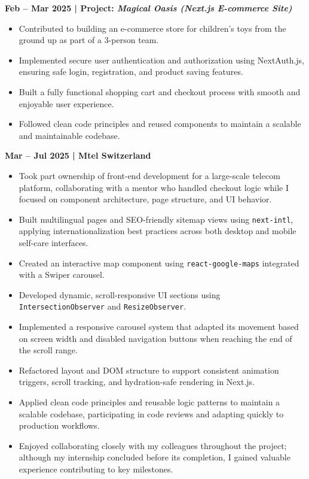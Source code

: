 \documentclass[11pt]{article}
\begin{document}
\textbf{Feb – Mar 2025 | Project: \textit{Magical Oasis (Next.js E-commerce Site)}}
\begin{itemize}[leftmargin=*]
  \item Contributed to building an e-commerce store for children’s toys from the ground up as part of a 3-person team.
  \item Implemented secure user authentication and authorization using NextAuth.js, ensuring safe login, registration, and product saving features.
  \item Built a fully functional shopping cart and checkout process with smooth and enjoyable user experience.
  \item Followed clean code principles and reused components to maintain a scalable and maintainable codebase.
\end{itemize}

\textbf{Mar – Jul 2025 | Mtel Switzerland}
\begin{itemize}[leftmargin=*]
  \item Took part ownership of front-end development for a large-scale telecom platform, collaborating with a mentor who handled checkout logic while I focused on component architecture, page structure, and UI behavior.
  \item Built multilingual pages and SEO-friendly sitemap views using \texttt{next-intl}, applying internationalization best practices across both desktop and mobile self-care interfaces.
  \item Created an interactive map component using \texttt{react-google-maps} integrated with a Swiper carousel.
  \item Developed dynamic, scroll-responsive UI sections using \texttt{IntersectionObserver} and \texttt{ResizeObserver}.
  \item Implemented a responsive carousel system that adapted its movement based on screen width and disabled navigation buttons when reaching the end of the scroll range.
  \item Refactored layout and DOM structure to support consistent animation triggers, scroll tracking, and hydration-safe rendering in Next.js.
  \item Applied clean code principles and reusable logic patterns to maintain a scalable codebase, participating in code reviews and adapting quickly to production workflows.
  \item Enjoyed collaborating closely with my colleagues throughout the project; although my internship concluded before its completion, I gained valuable experience contributing to key milestones.
\end{itemize}
\end{document}
